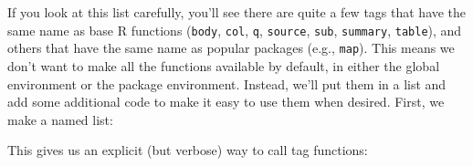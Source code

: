 \begin{Shaded}
\begin{Highlighting}[]
\StringTok{ }\NormalTok{(}\NormalTok{, }\NormalTok{, }\NormalTok{, }\NormalTok{, }\NormalTok{, }\NormalTok{,}
  \NormalTok{, }\NormalTok{, }\NormalTok{, }\NormalTok{, }\NormalTok{, }\NormalTok{, }\NormalTok{, }
  \NormalTok{, }\NormalTok{, }\NormalTok{)}
\end{Highlighting}
\end{Shaded}

If you look at this list carefully, you'll see there are quite a few
tags that have the same name as base R functions (\texttt{body},
\texttt{col}, \texttt{q}, \texttt{source}, \texttt{sub},
\texttt{summary}, \texttt{table}), and others that have the same name as
popular packages (e.g., \texttt{map}). This means we don't want to make
all the functions available by default, in either the global environment
or the package environment. Instead, we'll put them in a list and add
some additional code to make it easy to use them when desired. First, we
make a named list:

\begin{Shaded}
\begin{Highlighting}[]
\StringTok{ }\NormalTok{(}
  \NormalTok{(}
  \NormalTok{(}
\NormalTok{)}
\end{Highlighting}
\end{Shaded}

This gives us an explicit (but verbose) way to call tag functions:

\begin{Shaded}
\begin{Highlighting}[]
\NormalTok{(}\NormalTok{(}\NormalTok{),}
  \NormalTok{(}\NormalTok{))}
\end{Highlighting}
\end{Shaded}

